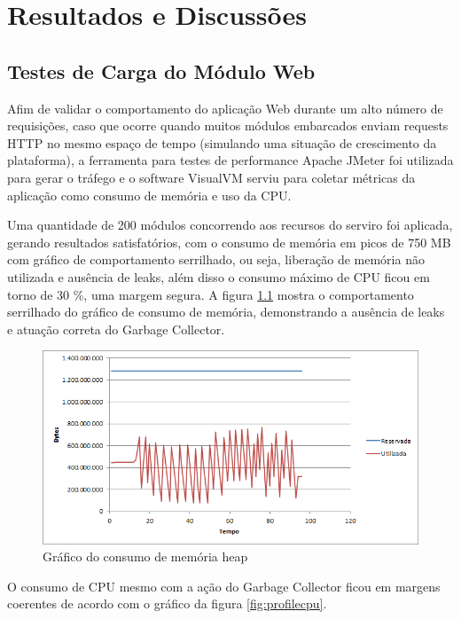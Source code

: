 \chapter{Resultados e Discussões}
\label{cap:resultados e discussoes}

\section{Testes de Carga do Módulo Web}

Afim de validar o comportamento do aplicação Web durante um alto número de requisições, caso que ocorre quando muitos módulos embarcados enviam requests HTTP no mesmo espaço de tempo (simulando uma situação de crescimento da plataforma), a ferramenta para testes de performance Apache JMeter foi utilizada para gerar o tráfego e o software VisualVM serviu para coletar métricas da aplicação como consumo de memória e uso da CPU.

Uma quantidade de 200 módulos concorrendo aos recursos do serviro foi aplicada, gerando resultados satisfatórios, com o consumo de memória em picos de 750 MB com gráfico de comportamento serrilhado, ou seja, liberação de memória não utilizada e ausência de leaks, além disso o consumo máximo de CPU ficou em torno de 30 \%, uma margem segura. A figura \ref{fig:profilemem} mostra o comportamento serrilhado do gráfico de consumo de memória, demonstrando a ausência de leaks e atuação correta do Garbage Collector.

\begin{figure}[!htb]
	\centering
	\includegraphics[width=\textwidth]{figures/teste_heap.png}
	\caption{Gráfico do consumo de memória heap}
	\label{fig:profilemem}
\end{figure}

\newpage
O consumo de CPU mesmo com a ação do Garbage Collector ficou em margens coerentes de acordo com o gráfico da figura \ref{fig:profilecpu}.

